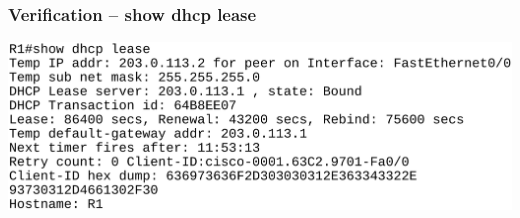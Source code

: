 \documentclass[pdflatex,compress,mathserif]{beamer}
\begin{document}
\begin{frame}
	\frametitle{Verification – show dhcp lease}
	\begin{center}
		\includegraphics[width=\linewidth]{img/img11}
	\end{center}
\end{frame}
\end{document}
